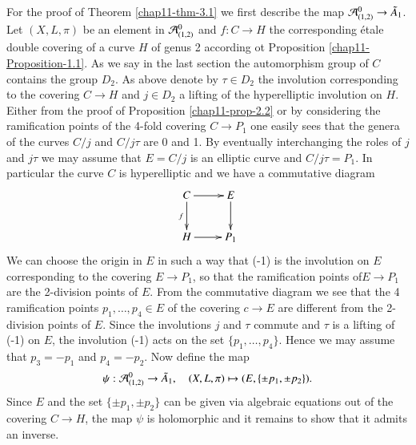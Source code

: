 For the proof of Theorem \ref{chap11-thm-3.1} we first describe the map $\mathcal{A}^{0}_{(1,2)} \rightarrow \tilde{A}_{1}$. Let $(X, L, \pi)$ be an element in $\mathcal{A}^{0}_{(1,2)}$ and $f: C \rightarrow H$ the corresponding \'etale double covering of a curve $H$ of genus 2 according ot Proposition \ref{chap11-Proposition-1.1}. As we say in the last section the automorphism group of $C$ contains the group $D_{2}$. As above denote by $\tau \in D_{2}$ the involution corresponding to the covering $C \rightarrow H$ and $j \in D_{2}$ a lifting of the hyperelliptic involution on $H$. Either from the proof of Proposition \ref{chap11-prop-2.2} or by considering the ramification points of the 4-fold covering $C\rightarrow P_{1}$ one easily sees that the genera of the curves $C/j$ and $C/j\tau$ are 0 and 1. By eventually interchanging the roles of $j$ and $j\tau$ we may assume that $E=C/j$ is an elliptic curve and $C/j\tau = P_{1}$. In particular the curve $C$ is hyperelliptic and we have a commutative diagram
$$
\xymatrix{
C \ar[r] \ar[d]_{f} & E \ar[d]\\
H \ar[r] & P_{1}}  
$$
We can choose the origin in $E$ in such a way that (-1) is the involution on $E$ corresponding to the covering $E \rightarrow P_{1}$, so that the ramification points of\pageoriginale $E \rightarrow P_{1}$ are the 2-division points of $E$. From the commutative diagram we see that the 4 ramification points $p_{1}, \ldots, p_{4} \in E$ of the covering $c\rightarrow E$ are different from the 2-division points of $E$. Since the involutions $j$ and $\tau$ commute and $\tau$ is a lifting of (-1) on $E$, the involution (-1) acts on the set $\{p_{1}, \ldots,p_{4}\}$. Hence we may assume that $p_{3} =-p_{1}$ and $p_{4}=-p_{2}$. Now define the map
$$
\psi : \mathcal{A}_{(1,2)}^{0} \rightarrow \tilde{A}_{1}, \quad (X, L, \pi)\mapsto (E, \{\pm p_{1}, \pm p_{2}\}).
$$ 
Since $E$ and the set $\{\pm p_{1}, \pm p_{2}\}$ can be given via algebraic equations out of the covering
$C\rightarrow H$, the map $\psi$ is holomorphic and it remains to show that it admits an inverse.

